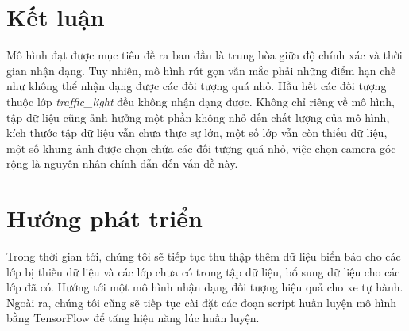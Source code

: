 \documentclass[../thesis.tex]{subfiles}
\begin{document}
\section{Kết luận}

Mô hình đạt được mục tiêu đề ra ban đầu là trung hòa giữa độ chính xác và thời gian nhận dạng. Tuy nhiên, mô hình rút gọn vẫn mắc phải những điểm hạn chế như không thể nhận dạng được các đối tượng quá nhỏ. Hầu hết các đối tượng thuộc lớp \textit{traffic\_light} đều không nhận dạng được. Không chỉ riêng về mô hình, tập dữ liệu cũng ảnh hưởng một phần không nhỏ đến chất lượng của mô hình, kích thước tập dữ liệu vẫn chưa thực sự lớn, một số lớp vẫn còn thiếu dữ liệu, một số khung ảnh được chọn chứa các đối tượng quá nhỏ, việc chọn camera góc rộng là nguyên nhân chính dẫn đến vấn đề này.

\section{Hướng phát triển}

Trong thời gian tới, chúng tôi sẽ tiếp tục thu thập thêm dữ liệu biển báo cho các lớp bị thiếu dữ liệu và các lớp chưa có trong tập dữ liệu, bổ sung dữ liệu cho các lớp đã có. Hướng tới một mô hình nhận dạng đối tượng hiệu quả cho xe tự hành. Ngoài ra, chúng tôi cũng sẽ tiếp tục cài đặt các đoạn script huấn luyện mô hình bằng TensorFlow để tăng hiệu năng lúc huấn luyện. 
\end{document}
